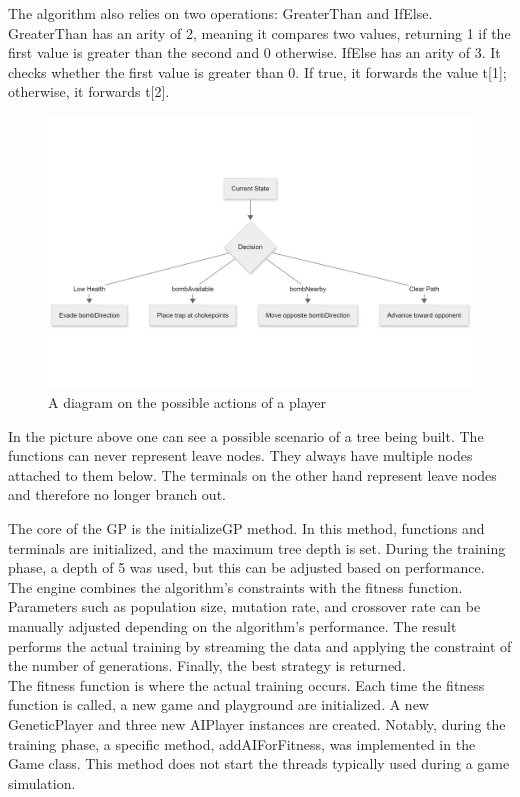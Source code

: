 \documentclass[sigconf]{acmart} %
\begin{document}
\begin{enumerate}
The algorithm also relies on two operations: GreaterThan and IfElse. GreaterThan has an arity of 2, meaning it compares two values, returning 1 if the first value is greater than the second and 0 otherwise. IfElse has an arity of 3. It checks whether the first value is greater than 0. If true, it forwards the value t[1]; otherwise, it forwards t[2].

\begin{figure}
      \centering
      \includegraphics[width = 1.25\linewidth]{pictures/possibleActionsPlayer.png}
      \caption{\label{fig:possibleActionsPlayer}A diagram on the possible actions of a player}
\end{figure}

In the picture above one can see a possible scenario of a tree being built. The functions can never represent leave nodes. They always have multiple nodes attached to them below. The terminals on the other hand represent leave nodes and therefore no longer branch out. 

The core of the GP is the initializeGP method. In this method, functions and terminals are initialized, and the maximum tree depth is set. During the training phase, a depth of 5 was used, but this can be adjusted based on performance. The engine combines the algorithm's constraints with the fitness function. Parameters such as population size, mutation rate, and crossover rate can be manually adjusted depending on the algorithm's performance. The result performs the actual training by streaming the data and applying the constraint of the number of generations. Finally, the best strategy is returned. \\ 
The fitness function is where the actual training occurs. Each time the fitness function is called, a new game and playground are initialized. A new GeneticPlayer and three new AIPlayer instances are created. Notably, during the training phase, a specific method, addAIForFitness, was implemented in the Game class. This method does not start the threads typically used during a game simulation.


\end{enumerate}
\end{document}
